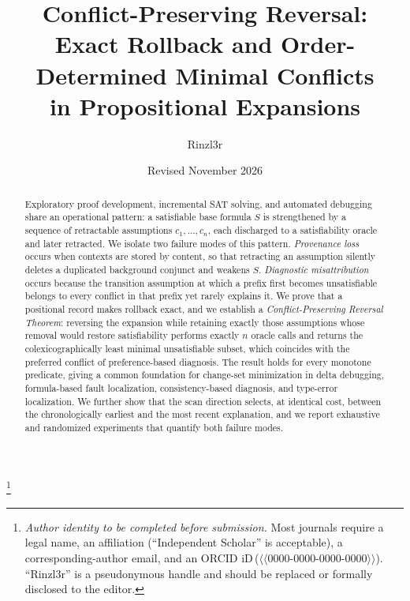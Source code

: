 \documentclass[11pt,reqno]{amsart}
\theoremstyle{plain}
\theoremstyle{definition}
\newcommand{\placeholder}[1]{{\normalfont\sffamily\color{red!60!black}$\langle\!\langle$#1$\rangle\!\rangle$}}
\begin{document}
\title[Conflict-Preserving Reversal]{Conflict-Preserving Reversal:\\
Exact Rollback and Order-Determined Minimal Conflicts\\ in Propositional Expansions}

\author{Rinzl3r}
\address{Independent researcher}
\email{\placeholder{contact email -- required before submission}}
\thanks{\emph{Author identity to be completed before submission.} Most journals
require a legal name, an affiliation (``Independent Scholar'' is acceptable), a
corresponding-author email, and an ORCID iD\,(\placeholder{0000-0000-0000-0000}).
``Rinzl3r'' is a pseudonymous handle and should be replaced or formally
disclosed to the editor.}

\date{Revised November 2026}


\begin{abstract}
Exploratory proof development, incremental SAT solving, and automated debugging
share an operational pattern: a satisfiable base formula $S$ is strengthened by a
sequence of retractable assumptions $c_1,\dots,c_n$, each discharged to a
satisfiability oracle and later retracted. We isolate two failure modes of this
pattern. \emph{Provenance loss} occurs when contexts are stored by content, so
that retracting an assumption silently deletes a duplicated background conjunct
and weakens $S$. \emph{Diagnostic misattribution} occurs because the transition
assumption at which a prefix first becomes unsatisfiable belongs to every
conflict in that prefix yet rarely explains it. We prove that a positional record
makes rollback exact, and we establish a \emph{Conflict-Preserving Reversal
Theorem}: reversing the expansion while retaining exactly those assumptions whose
removal would restore satisfiability performs exactly $n$ oracle calls and returns
the colexicographically least minimal unsatisfiable subset, which coincides with
the preferred conflict of preference-based diagnosis. The result holds for every
monotone predicate, giving a common foundation for change-set minimization in
delta debugging, formula-based fault localization, consistency-based diagnosis,
and type-error localization. We further show that the scan direction selects, at
identical cost, between the chronologically earliest and the most recent
explanation, and we report exhaustive and randomized experiments that quantify
both failure modes.
\end{abstract}
\end{document}
